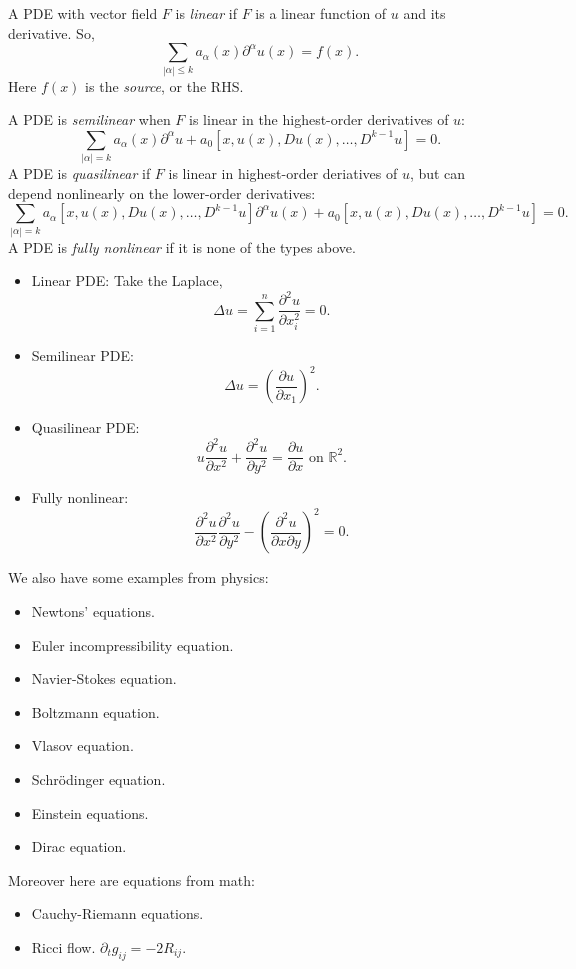 \documentclass[12pt]{article}
\begin{document}
\begin{definition}
	A PDE with vector field $F$ is \emph{linear} if $F$ is a linear function of $u$ and its derivative. So,
	\[
	\sum_{|\alpha| \leq k} a_\alpha(x) \partial^\alpha u(x) = f(x).
	\]
	Here $f(x)$ is the \emph{source}, or the RHS.

	A PDE is \emph{semilinear} when $F$ is linear in the highest-order derivatives of $u$:
	\[
		\sum_{|\alpha| = k} a_\alpha(x) \partial^\alpha u + a_0[x, u(x), Du(x), \ldots, D^{k-1}u] = 0.
	\]
	A PDE is \emph{quasilinear} if $F$ is linear in highest-order deriatives of $u$, but can depend nonlinearly on the lower-order derivatives:
	\[
		\sum_{|\alpha| = k} a_\alpha[x, u(x), Du(x), \ldots, D^{k-1}u] \partial^\alpha u(x) + a_0[x, u(x), Du(x), \ldots, D^{k-1}u] = 0.
	\]
	A PDE is \emph{fully nonlinear} if it is none of the types above.
\end{definition}

\begin{exbox}
	\begin{itemize}
		\item Linear PDE: Take the Laplace,
			\[
			\Delta u = \sum_{i = 1}^n \frac{\partial^2 u}{\partial x_i^2} = 0.
			\]
		\item Semilinear PDE:
			\[
			\Delta u = \left( \frac{\partial u}{\partial x_1} \right)^2.
			\]
		\item Quasilinear PDE:
			\[
				u \frac{\partial^2 u}{\partial x^2} + \frac{\partial^2 u}{\partial y^2} = \frac{\partial u}{\partial x} \text{ on } \mathbb{R}^2.
			\]
		\item Fully nonlinear:
			\[
			\frac{\partial^2 u}{\partial x^2} \frac{\partial^2 u}{\partial y^2} - \left( \frac{\partial^2 u}{\partial x\partial y} \right)^2 = 0.
			\]
	\end{itemize}
	We also have some examples from physics:
	\begin{itemize}
		\item Newtons' equations.
		\item Euler incompressibility equation.
		\item Navier-Stokes equation.
		\item Boltzmann equation.
		\item Vlasov equation.
		\item Schr\"odinger equation.
		\item Einstein equations.
		\item Dirac equation.
	\end{itemize}
	Moreover here are equations from math:
	\begin{itemize}
		\item Cauchy-Riemann equations.
		\item Ricci flow. $\partial_t g_{ij} = -2 R_{ij}$.
	\end{itemize}
\end{exbox}
\end{document}
